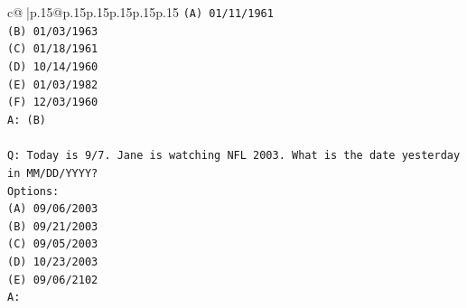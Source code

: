 \documentclass{article}
\begin{document}
{\begin{supertabular}{c@{$\;$}|p{.15\linewidth}@{}p{.15\linewidth}p{.15\linewidth}p{.15\linewidth}p{.15\linewidth}p{.15\linewidth}}
{{{\texttt{(A) 01/11/1961} \\
\texttt{(B) 01/03/1963} \\
\texttt{(C) 01/18/1961} \\
\texttt{(D) 10/14/1960} \\
\texttt{(E) 01/03/1982} \\
\texttt{(F) 12/03/1960} \\
\texttt{A: (B)} \\
\\ 
\texttt{Q: Today is 9/7. Jane is watching NFL 2003. What is the date yesterday in MM/DD/YYYY?} \\
\texttt{Options:} \\
\texttt{(A) 09/06/2003} \\
\texttt{(B) 09/21/2003} \\
\texttt{(C) 09/05/2003} \\
\texttt{(D) 10/23/2003} \\
\texttt{(E) 09/06/2102} \\
\texttt{A:} \\
            }
        }
    }
     \\ \\


\end{supertabular}}
\end{document}
